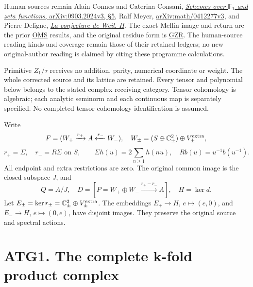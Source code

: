 Human sources remain Alain Connes and Caterina Consani,
\href{https://arxiv.org/abs/0903.2024v3}{\emph{Schemes over
\(\mathbb F_1\) and zeta functions}, arXiv:0903.2024v3, §5}, Ralf Meyer,
\href{https://arxiv.org/abs/math/0412277v3}{arXiv:math/0412277v3}, and
Pierre Deligne,
\href{https://www.numdam.org/item/PMIHES_1980__52__137_0/}{\emph{La
conjecture de Weil. II}}. The exact Mellin image and return are the
prior
\href{https://github.com/KokunoYumeto/zeta-function-research-reader/blob/36a82ecca98addb8a98b48204e349737856c7223/workbenches/splitzero-tandem/continuations/20260924-cohomology-weight-and-character-lifts/original-character-lifting/tau_lifting_weights_20260924/ORIGINAL_MELLIN_SPECTRAL_SYNTHESIS.md}{OMS}
results, and the original residue form is
\href{https://github.com/KokunoYumeto/zeta-function-research-reader/blob/36a82ecca98addb8a98b48204e349737856c7223/workbenches/splitzero-tandem/continuations/20260924-cohomology-weight-and-character-lifts/original-character-lifting/tau_lifting_weights_20260924/GLOBAL_ORIGINAL_ZETA_RESIDUE_DUALITY_INDEPENDENT.md}{GZR}.
The human-source reading kinds and coverage remain those of their
retained ledgers; no new original-author reading is claimed by citing
these programme calculations.

Primitive \(Z_1/\tau\) receives no addition, parity, numerical
coordinate or weight. The whole corrected source and its lattice are
retained. Every tensor and polynomial below belongs to the stated
complex receiving category. Tensor cohomology is algebraic; each
analytic seminorm and each continuous map is separately specified. No
completed-tensor cohomology identification is assumed.

Write \[
F=(W_+\xrightarrow{r_+}A\xleftarrow{r_-}W_-),\quad
W_\pm=(S\oplus\mathbb C^2_\pm)\oplus V_\pm^{\rm extra},
\] \[
r_+=\Sigma,\quad r_-=R\Sigma\text{ on }S,\qquad
\Sigma h(u)=2\sum_{n\ge1}h(nu),\quad Rb(u)=u^{-1}b(u^{-1}).
\] All endpoint and extra restrictions are zero. The original common
image is the closed subspace \(J\), and \[
Q=A/J,\quad
D=[P=W_+\oplus W_-\xrightarrow{r_+-r_-}A],\quad H=\ker d.
\] Let \(E_\pm=\ker r_\pm=\mathbb C^2_\pm\oplus V_\pm^{\rm extra}\). The
embeddings \(E_+\to H\), \(e\mapsto(e,0)\), and \(E_-\to H\),
\(e\mapsto(0,e)\), have disjoint images. They preserve the original
source and spectral actions.

\section{ATG1. The complete k-fold product
complex}\label{atg1.-the-complete-k-fold-product-complex}

